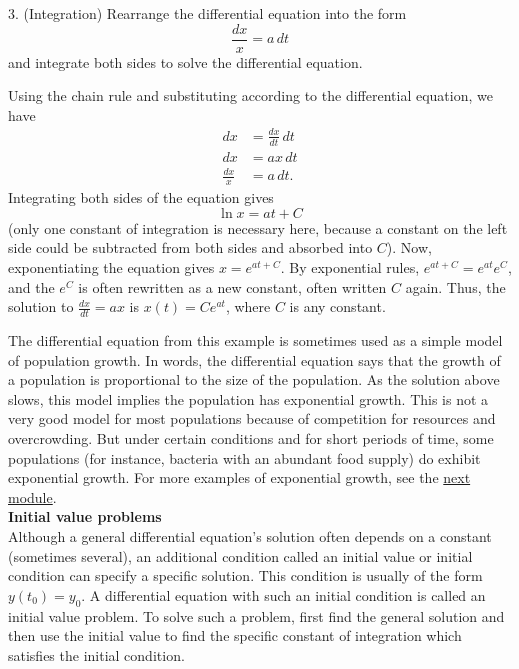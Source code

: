 \documentclass[twoside,openright,titlepage,a4paper]{book}
\begin{document}
\begin{sloppypar}
3. (Integration) Rearrange the differential equation into the form \[ \frac{dx}{x} = a \, dt \] and integrate both sides to solve the differential equation.
\begin{examplebox}
Using the chain rule and substituting according to the differential equation, we have
\begin{align*} 
dx &= \frac{dx}{dt} \, dt \\
dx &= a x \, dt \\
\frac{dx}{x} &= a \, dt. 
\end{align*}
Integrating both sides of the equation gives \[ \ln x = at+C \] (only one constant of integration is necessary here, because a constant on the left side could be subtracted from both sides and absorbed into $C$). Now, exponentiating the equation gives $x = e^{at+C}$. By exponential rules, $e^{at+C} = e^{at}e^C$, and the $e^C$ is often rewritten as a new constant, often written $C$ again.
Thus, the solution to $\frac{dx}{dt} = ax$ is $x(t) = Ce^{at}$, where $C$ is any constant.	
\end{examplebox}
	
The differential equation from this example is sometimes used as a simple model of population growth. In words, the differential equation says that the growth of a population is proportional to the size of the population. As the solution above slows, this model implies the population has exponential growth. This is not a very good model for most populations because of competition for resources and overcrowding. But under certain conditions and for short periods of time, some populations (for instance, bacteria with an abundant food supply) do exhibit exponential growth. For more examples of exponential growth, see the \hyperref[ChIntegrationSecExponentialGrowthExamples]{next module}.\\
	
\textbf{Initial value problems}\\

Although a general differential equation's solution often depends on a constant (sometimes several), an additional condition called an initial value or initial condition can specify a specific solution. This condition is usually of the form $y(t_0) = y_0$. A differential equation with such an initial condition is called an initial value problem. To solve such a problem, first find the general solution and then use the initial value to find the specific constant of integration which satisfies the initial condition.


\end{sloppypar}
\end{document}
